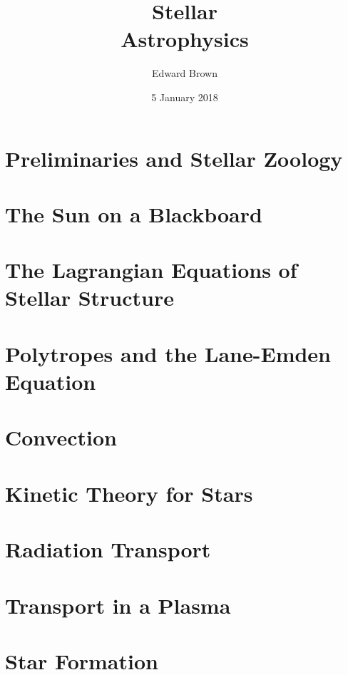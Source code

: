 \documentclass{astro-bookshelf}
\title{Stellar\\Astrophysics}
\author{Edward Brown}
\date{5 January 2018}
\begin{document}
\frontmatter
{}


\mainmatter
{}
\setcounter{page}{1}


\chapter[Preliminaries]{Preliminaries and Stellar Zoology}\label{ch.prelim}


\chapter{The Sun on a Blackboard}\label{ch.introduction}


\chapter[Equations of Stellar Structure]{The Lagrangian Equations of Stellar Structure}\label{ch.stellar-structure-eqn}


\chapter[Polytropes]{Polytropes and the Lane-Emden Equation}\label{ch.polytropes}


\chapter{Convection}\label{s.convection}


\chapter[Kinetic Theory]{Kinetic Theory for Stars}\label{ch.kinetic}


\chapter{Radiation Transport}


\chapter{Transport in a Plasma}\label{ch.plasma-transport}


\chapter{Star Formation}\label{ch.star-formation}

\end{document}
